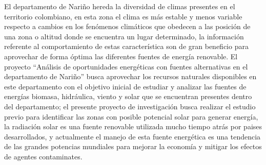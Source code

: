 El departamento de Nariño hereda la diversidad de climas presentes en el territorio colombiano, en esta zona el clima es más 
estable y menos variable respecto a cambios en los fenómenos climáticos que obedecen a las posición de una zona o altitud 
donde se encuentra un lugar determinado, la información referente al comportamiento de estas característica son de gran 
beneficio para aprovechar de forma óptima las diferentes fuentes de energía renovable. El proyecto “Análisis de oportunidades energéticas con fuentes alternativas 
en el departamento de Nariño” busca aprovechar los recursos naturales disponibles en este departamento con el objetivo inicial de
estudiar y analizar las fuentes de energías biomasa, hidráulica, viento y solar que se encuentran presentes dentro del departamento; 
el presente proyecto de investigación busca realizar el estudio previo para identificar las zonas con posible potencial solar para generar 
energía, la radiación solar es una fuente renovable utilizada mucho tiempo atrás por paises desarrollados, y actualmente  el manejo de esta 
fuente energética es una tendencia de las grandes potencias mundiales para mejorar la economía y mitigar los efectos de agentes contaminates.

